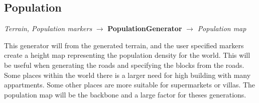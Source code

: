 \subsection{Population}
\begin{center}
    \textit{Terrain, Population markers} $\rightarrow$ \textbf{PopulationGenerator} $\rightarrow$ \textit{Population map} 
\end{center}
This generator will from the generated terrain, and the user specified markers create a height map representing the population density for the world.
This will be useful when generating the roads and specifying the blocks from the roads. 
Some places within the world there is a larger need for high building with many appartments. 
Some other places are more suitable for supermarkets or villas. 
The population map will be the backbone and a large factor for theses generations. 